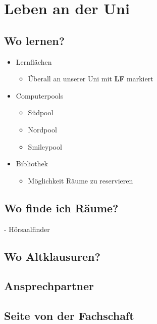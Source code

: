 \documentclass[
	aspectratio=169, 
	8pt 
]{beamer}
\begin{document}
\section{Leben an der Uni}
\subsection{Wo lernen?}
\begin{frame}{\insertsubsection}
    \begin{itemize}
        \item Lernflächen \begin{itemize} \item Überall an unserer Uni mit \textbf{LF} markiert \end{itemize}
        \item Computerpools \begin{itemize}
            \item Südpool
            \item Nordpool
            \item Smileypool \end{itemize}
        \item Bibliothek \begin{itemize} \item Möglichkeit Räume zu reservieren \end{itemize}
    \end{itemize}
\end{frame}

\subsection{Wo finde ich Räume?}
\begin{frame}{\insertsubsection - Hörsaalfinder}
    \begin{fancycolumns}
    \end{fancycolumns}
\end{frame}

\subsection{Wo Altklausuren?}
\subsection{Ansprechpartner}
\subsection{Seite von der Fachschaft}
\end{document}
